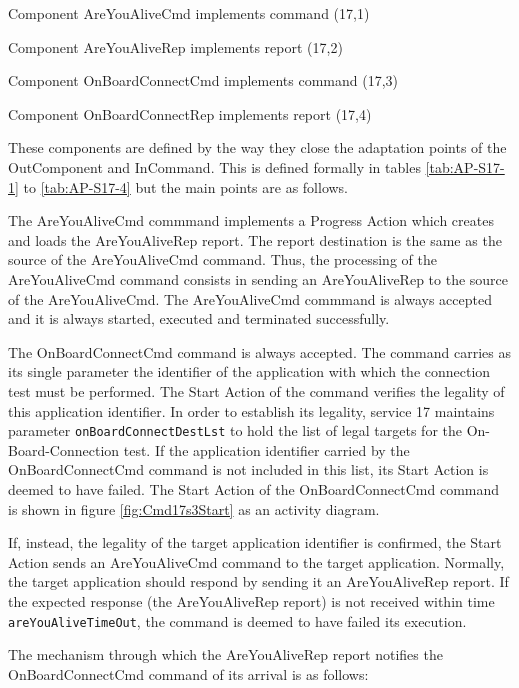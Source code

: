\documentclass[a4paper,10pt]{article}
\newenvironment{fw_itemize}						%
{\begin{itemize}
  \setlength{\itemsep}{1mm}
  \setlength{\parskip}{0pt}
  \setlength{\parsep}{0pt}}
{\end{itemize}}
\begin{document}
\begin{fw_itemize}
\item Component AreYouAliveCmd implements command (17,1) 
\item Component AreYouAliveRep implements report (17,2) 
\item Component OnBoardConnectCmd implements command (17,3)  
\item Component OnBoardConnectRep implements report (17,4) 
\end{fw_itemize}

These components are defined by the way they close the adaptation points of the OutComponent and InCommand. This is defined formally in tables \ref{tab:AP-S17-1} to \ref{tab:AP-S17-4} but the main points are as follows.

The AreYouAliveCmd commmand implements a Progress Action which creates and loads the AreYouAliveRep report. The report destination is the same as the source of the AreYouAliveCmd command. Thus, the processing of the AreYouAliveCmd command consists in sending an AreYouAliveRep to the source of the AreYouAliveCmd. The AreYouAliveCmd commmand is always accepted and it is always started, executed and terminated successfully.

The OnBoardConnectCmd command is always accepted. The command carries as its single parameter the identifier of the application with which the connection test must be performed. The Start Action of the command verifies the legality of this application identifier. In order to establish its legality, service 17 maintains parameter \texttt{onBoardConnectDestLst} to hold the list of legal targets for the On-Board-Connection test. If the application identifier carried by the OnBoardConnectCmd command is not included in this list, its Start Action is deemed to have failed. The Start Action of the OnBoardConnectCmd command is shown in figure \ref{fig:Cmd17s3Start} as an activity diagram.

If, instead, the legality of the target application identifier is confirmed, the Start Action sends an AreYouAliveCmd command to the target application. Normally, the target application should respond by sending it an AreYouAliveRep report. If the expected response (the AreYouAliveRep report) is not received within time \texttt{areYouAliveTimeOut}, the command is deemed to have failed its execution.

The mechanism through which the AreYouAliveRep report notifies the OnBoardConnectCmd command of its arrival is as follows:
\end{document}

